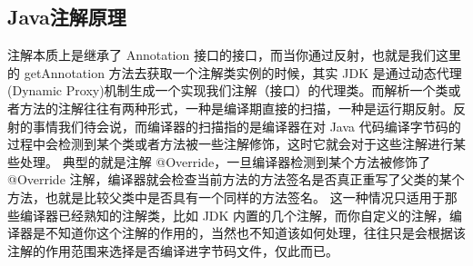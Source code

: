 \documentclass[../../../interview-questions.tex]{subfiles}
\begin{document}
\subsection{Java注解原理}

注解本质上是继承了 Annotation 接口的接口，而当你通过反射，也就是我们这里的 getAnnotation 方法去获取一个注解类实例的时候，其实 JDK 是通过动态代理(Dynamic Proxy)机制生成一个实现我们注解（接口）的代理类。而解析一个类或者方法的注解往往有两种形式，一种是编译期直接的扫描，一种是运行期反射。反射的事情我们待会说，而编译器的扫描指的是编译器在对 Java 代码编译字节码的过程中会检测到某个类或者方法被一些注解修饰，这时它就会对于这些注解进行某些处理。
典型的就是注解 @Override，一旦编译器检测到某个方法被修饰了 @Override 注解，编译器就会检查当前方法的方法签名是否真正重写了父类的某个方法，也就是比较父类中是否具有一个同样的方法签名。
这一种情况只适用于那些编译器已经熟知的注解类，比如 JDK 内置的几个注解，而你自定义的注解，编译器是不知道你这个注解的作用的，当然也不知道该如何处理，往往只是会根据该注解的作用范围来选择是否编译进字节码文件，仅此而已。
\end{document}

